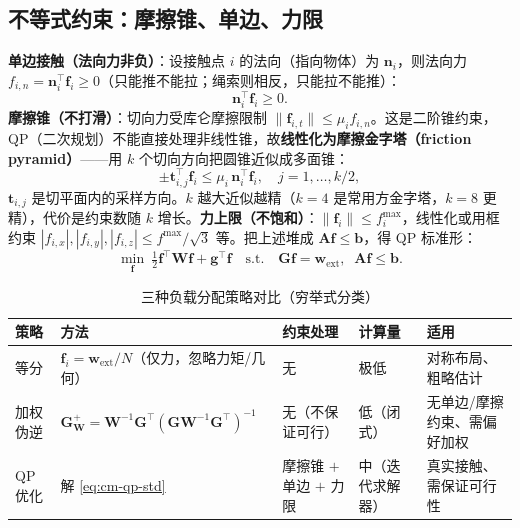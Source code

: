 \subsection{不等式约束：摩擦锥、单边、力限}
\label{sec:cm-qp-ineq}
\textbf{单边接触（法向力非负）}：设接触点 $i$ 的法向（指向物体）为 $\mathbf{n}_i$，则法向力 $f_{i,n}=\mathbf{n}_i^\top\mathbf{f}_i\ge 0$（只能推不能拉；绳索则相反，只能拉不能推）：
\begin{equation}
  \mathbf{n}_i^\top\mathbf{f}_i\ge 0.
  \label{eq:cm-qp-unilateral}
\end{equation}
\textbf{摩擦锥（不打滑）}：切向力受库仑摩擦限制 $\|\mathbf{f}_{i,t}\|\le\mu_i f_{i,n}$。这是二阶锥约束，QP（二次规划）不能直接处理非线性锥，故\textbf{线性化为摩擦金字塔（friction pyramid）}——用 $k$ 个切向方向把圆锥近似成多面锥：
\begin{equation}
  \pm\mathbf{t}_{i,j}^\top\mathbf{f}_i\le\mu_i\,\mathbf{n}_i^\top\mathbf{f}_i,\quad j=1,\dots,k/2,
  \label{eq:cm-qp-friction}
\end{equation}
$\mathbf{t}_{i,j}$ 是切平面内的采样方向。$k$ 越大近似越精（$k=4$ 是常用方金字塔，$k=8$ 更精），代价是约束数随 $k$ 增长。\textbf{力上限（不饱和）}：$\|\mathbf{f}_i\|\le f_i^{\max}$，线性化或用框约束 $|f_{i,x}|,|f_{i,y}|,|f_{i,z}|\le f^{\max}/\sqrt{3}$ 等。把上述堆成 $\mathbf{A}\mathbf{f}\le\mathbf{b}$，得 QP 标准形：
\begin{equation}
\boxed{\;
  \min_{\mathbf{f}}\ \tfrac12\mathbf{f}^\top\mathbf{W}\mathbf{f}+\mathbf{g}^\top\mathbf{f}
  \quad\text{s.t.}\quad
  \mathbf{G}\mathbf{f}=\mathbf{w}_{\text{ext}},\;\; \mathbf{A}\mathbf{f}\le\mathbf{b}.
\;}
  \label{eq:cm-qp-std}
\end{equation}

\begin{table}[H]\centering\small
\caption{三种负载分配策略对比（穷举式分类）}
\label{tab:cm-qp-strategies}
\begin{tabular}{p{1.8cm}p{4.6cm}p{2.6cm}p{1.4cm}p{2.4cm}}
\toprule
策略 & 方法 & 约束处理 & 计算量 & 适用 \\
\midrule
等分 & $\mathbf{f}_i=\mathbf{w}_{\text{ext}}/N$（仅力，忽略力矩/几何） & 无 & 极低 & 对称布局、粗略估计 \\
加权伪逆 & $\mathbf{G}_{\mathbf{W}}^{+}=\mathbf{W}^{-1}\mathbf{G}^\top(\mathbf{G}\mathbf{W}^{-1}\mathbf{G}^\top)^{-1}$ & 无（不保证可行） & 低（闭式） & 无单边/摩擦约束、需偏好加权 \\
QP 优化 & 解 \cref{eq:cm-qp-std} & 摩擦锥 $+$ 单边 $+$ 力限 & 中（迭代求解器） & 真实接触、需保证可行性 \\
\bottomrule
\end{tabular}
\end{table}

